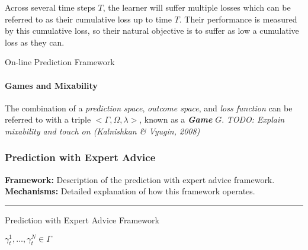 Across several time steps $T$, the learner will suffer multiple losses which can be referred to as their cumulative loss up to time $T$. Their performance is measured by this cumulative loss, so their natural objective is to suffer as low a cumulative loss as they can.

\begin{protocol}[H]
    \caption{On-line Prediction Framework}\label{on-line_prediction_framework}
    \begin{algorithmic}[1]
    \end{algorithmic}
\end{protocol}

\paragraph{Games and Mixability}
The combination of a \textit{prediction space}, \textit{outcome space}, and \textit{loss function} can be referred to with a triple $<\Gamma, \Omega, \lambda>$, known as a \textit{\textbf{Game}} $G$. \textit{TODO: Explain mixability and touch on (Kalnishkan \& Vyugin, 2008)}~\cite{kalnishkan/vyugin:2008}

\subsubsection{Prediction with Expert Advice}
\textbf{Framework:} Description of the prediction with expert advice framework.\newline
\textbf{Mechanisms:} Detailed explanation of how this framework operates.\newline
\noindent\rule{\textwidth}{0.1pt}
\begin{protocol}[H]
    \caption{Prediction with Expert Advice Framework}\label{alg:cap}
    \begin{algorithmic}[1]
        $\gamma^1_t, \ldots, \gamma^N_t \in \Gamma$
    \end{algorithmic}
\end{protocol}

